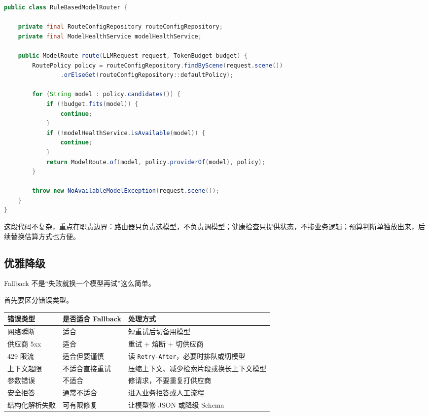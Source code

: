 \documentclass[9pt,a4paper,twocolumn]{ctexart}
\begin{document}
\begin{lstlisting}[language=Java]
public class RuleBasedModelRouter {

    private final RouteConfigRepository routeConfigRepository;
    private final ModelHealthService modelHealthService;

    public ModelRoute route(LLMRequest request, TokenBudget budget) {
        RoutePolicy policy = routeConfigRepository.findByScene(request.scene())
                .orElseGet(routeConfigRepository::defaultPolicy);

        for (String model : policy.candidates()) {
            if (!budget.fits(model)) {
                continue;
            }
            if (!modelHealthService.isAvailable(model)) {
                continue;
            }
            return ModelRoute.of(model, policy.providerOf(model), policy);
        }

        throw new NoAvailableModelException(request.scene());
    }
}
\end{lstlisting}



这段代码不复杂，重点在职责边界：路由器只负责选模型，不负责调模型；健康检查只提供状态，不掺业务逻辑；预算判断单独放出来，后续替换估算方式也方便。



\subsection*{优雅降级}


Fallback 不是“失败就换一个模型再试”这么简单。



首先要区分错误类型。


{\footnotesize
\begin{tabular}{|p{}|p{}|p{}|}
\hline
\textbf{错误类型} & \textbf{是否适合 Fallback} & \textbf{处理方式} \\
\hline
网络瞬断 & 适合 & 短重试后切备用模型 \\
\hline
供应商 5xx & 适合 & 重试 + 熔断 + 切供应商 \\
\hline
429 限流 & 适合但要谨慎 & 读 \texttt{Retry-After}，必要时排队或切模型 \\
\hline
上下文超限 & 不适合直接重试 & 压缩上下文、减少检索片段或换长上下文模型 \\
\hline
参数错误 & 不适合 & 修请求，不要重复打供应商 \\
\hline
安全拒答 & 通常不适合 & 进入业务拒答或人工流程 \\
\hline
结构化解析失败 & 可有限修复 & 让模型修 JSON 或降级 Schema \\
\hline
\end{tabular}
}
\end{document}
